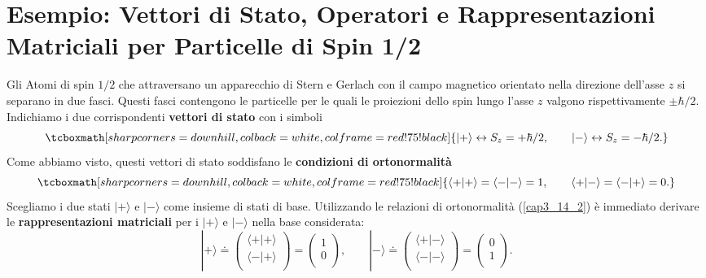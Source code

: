 \documentclass[a4paper,12pt,oneside]{book}
\begin{document}
\section[Esempio:Particelle di Spin 1/2]{Esempio: Vettori di Stato, Operatori e Rappresentazioni Matriciali per Particelle di Spin 1/2}
Gli Atomi di spin $1/2$ che attraversano un apparecchio di Stern e Gerlach con il campo magnetico orientato nella direzione dell'asse $z$ si separano in due fasci. Questi fasci contengono le particelle per le quali le proiezioni dello spin lungo l'asse $z$ valgono rispettivamente $\pm \hbar/2$. Indichiamo i due corrispondenti \textbf{vettori di stato} con i simboli
	\begin{equation}
		\tcboxmath[sharp corners=downhill ,colback=white,colframe=red!75!black]{
		| + \rangle \leftrightarrow S_z= +\hbar/2, \qquad | - \rangle \leftrightarrow S_z=-\hbar/2 .
		}
	\label{cap3_14}
	\end{equation}
Come abbiamo visto, questi vettori di stato soddisfano le \textbf{condizioni di ortonormalità}
	\begin{equation}
		\tcboxmath[sharp corners=downhill ,colback=white,colframe=red!75!black]{
			\langle + | + \rangle = \langle - | - \rangle =1,\qquad \langle + | - \rangle = \langle - | + \rangle =0 .
			}
	\label{cap3_14_2}
	\end{equation}
Scegliamo i due stati $| + \rangle $ e $ | - \rangle$ come insieme di stati di base. Utilizzando le relazioni di ortonormalità (\ref{cap3_14_2}) è immediato derivare le \textbf{rappresentazioni matriciali} per i $| + \rangle$ e $| - \rangle$ nella base considerata:
	\begin{equation}
		| + \rangle \doteq
		\begin{pmatrix}
		\langle + | + \rangle \\
		\langle - | + \rangle \\
		\end{pmatrix} = 
		\begin{pmatrix}
		1 \\
		0 \\
		\end{pmatrix}, \qquad
		| - \rangle \doteq
		\begin{pmatrix}
		\langle + | - \rangle \\
		\langle - | - \rangle \\
		\end{pmatrix} = 
		\begin{pmatrix}
		0 \\
		1 \\
		\end{pmatrix} .
	\end{equation}
\end{document}
